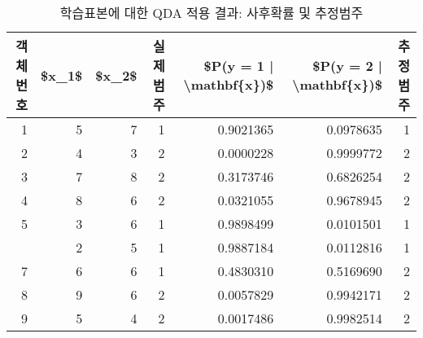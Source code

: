 \documentclass[
]{book}
\newenvironment{Shaded}{\begin{snugshade}}{\end{snugshade}}
\newcommand{\AttributeTok}[1]{\textcolor[rgb]{0.77,0.63,0.00}{#1}}
\newcommand{\ConstantTok}[1]{\textcolor[rgb]{0.00,0.00,0.00}{#1}}
\newcommand{\DecValTok}[1]{\textcolor[rgb]{0.00,0.00,0.81}{#1}}
\newcommand{\FunctionTok}[1]{\textcolor[rgb]{0.00,0.00,0.00}{#1}}
\newcommand{\NormalTok}[1]{#1}
\newcommand{\SpecialCharTok}[1]{\textcolor[rgb]{0.00,0.00,0.00}{#1}}
\newcommand{\StringTok}[1]{\textcolor[rgb]{0.31,0.60,0.02}{#1}}
\begin{document}
\begin{Shaded}
\end{Shaded}

\begin{table}

\caption{\label{tab:qda-posterior-result}학습표본에 대한 QDA 적용 결과: 사후확률 및 추정범주}
\centering
\begin{tabular}[t]{rrrrrrr}
\toprule
객체번호 & \$x\_1\$ & \$x\_2\$ & 실제범주 & \$P(y = 1 | \textbackslash{}mathbf\{x\})\$ & \$P(y = 2 | \textbackslash{}mathbf\{x\})\$ & 추정범주\\
\midrule
1 & 5 & 7 & 1 & 0.9021365 & 0.0978635 & 1\\
2 & 4 & 3 & 2 & 0.0000228 & 0.9999772 & 2\\
3 & 7 & 8 & 2 & 0.3173746 & 0.6826254 & 2\\
4 & 8 & 6 & 2 & 0.0321055 & 0.9678945 & 2\\
5 & 3 & 6 & 1 & 0.9898499 & 0.0101501 & 1\\
\addlinespace
6 & 2 & 5 & 1 & 0.9887184 & 0.0112816 & 1\\
7 & 6 & 6 & 1 & 0.4830310 & 0.5169690 & 2\\
8 & 9 & 6 & 2 & 0.0057829 & 0.9942171 & 2\\
9 & 5 & 4 & 2 & 0.0017486 & 0.9982514 & 2\\
\bottomrule
\end{tabular}
\end{table}
\end{document}
